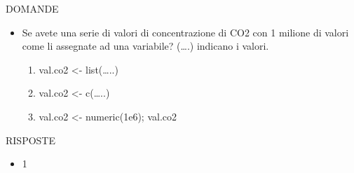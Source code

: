 \documentclass[
  ignorenonframetext,
]{beamer}
\providecommand{\tightlist}{%
  \setlength{\itemsep}{0pt}\setlength{\parskip}{0pt}}
\begin{document}
\begin{frame}{DOMANDE}
\protect\hypertarget{domande}{}
\begin{itemize}
\item
  Se avete una serie di valori di concentrazione di CO2 con 1 milione di
  valori come li assegnate ad una variabile? (\ldots.) indicano i
  valori.

  \begin{enumerate}
  \item
    val.co2 \textless- list(\ldots..)
  \item
    val.co2 \textless- c(\ldots..)
  \item
    val.co2 \textless- numeric(1e6); val.co2
  \end{enumerate}
\end{itemize}
\end{frame}

\begin{frame}{RISPOSTE}
\protect\hypertarget{risposte}{}
\begin{itemize}
\tightlist
\item
  1
\end{itemize}
\end{frame}
\end{document}
